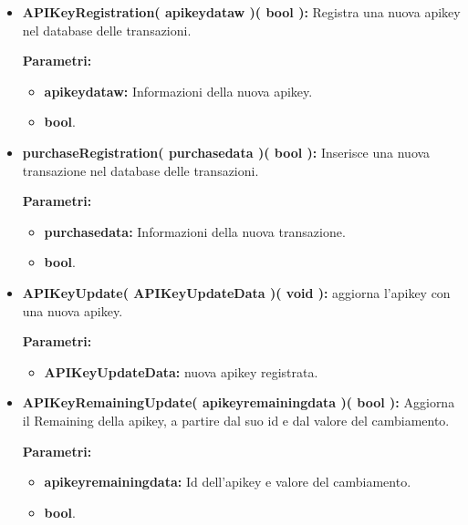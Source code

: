 \begin{itemize}
\begin{itemize}
			\item \textbf{APIKeyRegistration( apikeydataw )( bool ):} Registra una nuova apikey nel database delle transazioni.
				\begin{description}
    				\item[\textbf{Parametri:}]
				\end{description}
				\begin{itemize}
					\item \textbf{apikeydataw:} Informazioni della nuova apikey.
					\item \textbf{bool}.
				\end{itemize}
				
			\item \textbf{purchaseRegistration( purchasedata )( bool ):} Inserisce una nuova transazione nel database delle transazioni.
				\begin{description}
    				\item[\textbf{Parametri:}]
				\end{description}
				\begin{itemize}
					\item \textbf{purchasedata:} Informazioni della nuova transazione.
					\item \textbf{bool}.
				\end{itemize}
			
			\item \textbf{APIKeyUpdate( APIKeyUpdateData )( void ):} aggiorna l'apikey con una nuova apikey.
			\begin{description}
				\item[\textbf{Parametri:}]
			\end{description}
			\begin{itemize}
				\item \textbf{APIKeyUpdateData:} nuova apikey registrata.
			\end{itemize}
				
			\item \textbf{APIKeyRemainingUpdate( apikeyremainingdata )( bool ):} Aggiorna il Remaining della apikey, a partire dal suo id e dal valore del cambiamento.
				\begin{description}
    				\item[\textbf{Parametri:}]
				\end{description}
				\begin{itemize}
					\item \textbf{apikeyremainingdata:} Id dell'apikey e valore del cambiamento.
					\item \textbf{bool}.
				\end{itemize}
				
		\end{itemize}
\end{itemize}

